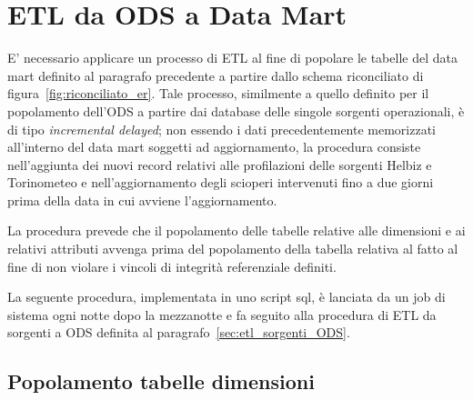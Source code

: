 \section{ETL da ODS a Data Mart}

E' necessario applicare un processo di ETL al fine di popolare le tabelle del
data mart definito al paragrafo precedente a partire dallo schema riconciliato
di figura~\ref{fig:riconciliato_er}. Tale processo, similmente a quello definito
per il popolamento dell'ODS a partire dai database delle singole sorgenti
operazionali, è di tipo \textit{incremental delayed}; non essendo i dati
precedentemente memorizzati all'interno del data mart soggetti ad aggiornamento,
la procedura consiste nell'aggiunta dei nuovi record relativi alle profilazioni
delle sorgenti Helbiz e Torinometeo e nell'aggiornamento degli scioperi
intervenuti fino a due giorni prima della data in cui avviene l'aggiornamento.

La procedura prevede che il popolamento delle tabelle relative alle dimensioni
e ai relativi attributi avvenga prima del popolamento della tabella relativa
al fatto al fine di non violare i vincoli di integrità referenziale definiti.

La seguente procedura, implementata in uno script sql, è lanciata da un job di
sistema ogni notte dopo la mezzanotte e fa seguito alla procedura di ETL
da sorgenti a ODS definita al paragrafo~\ref{sec:etl_sorgenti_ODS}.

\subsection{Popolamento tabelle dimensioni}

